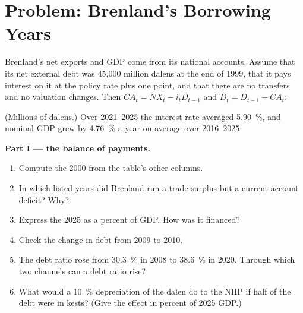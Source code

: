 \section{Problem: Brenland's Borrowing Years}\label{sec:b3:current-account:problem}

\begin{problem}\label{pb:b3:current-account:borrowing}
Brenland's net exports and GDP come from its national accounts. Assume that its net
external debt was 45{,}000 million dalens at the end of 1999, that it pays interest
on it at the policy rate plus one point, and that there are no transfers and no
valuation changes. Then $CA_t = NX_t - i_tD_{t-1}$ and $D_t = D_{t-1} - CA_t$:
\begin{center}\small
{}
\end{center}
(Millions of dalens.) Over 2021--2025 the interest rate averaged 5.90~\%, and nominal
GDP grew by 4.76~\% a year on average over 2016--2025. %

\medskip\noindent\textbf{Part I --- the balance of payments.}
\begin{enumerate}
\item Compute the 2000  from the table's other columns.
\item In which listed years did Brenland run a trade surplus but a current-account
deficit? Why?
\item Express the 2025  as a percent of GDP. How was it financed?
\item Check the change in debt from 2009 to 2010.
\item The debt ratio rose from 30.3~\% in 2008 to 38.6~\% in 2020. Through which two
channels can a debt ratio rise?
\item What would a 10~\% depreciation of the dalen do to the NIIP if half of the debt
were in kests? (Give the effect in percent of 2025 GDP.)
\end{enumerate}


\end{problem}
